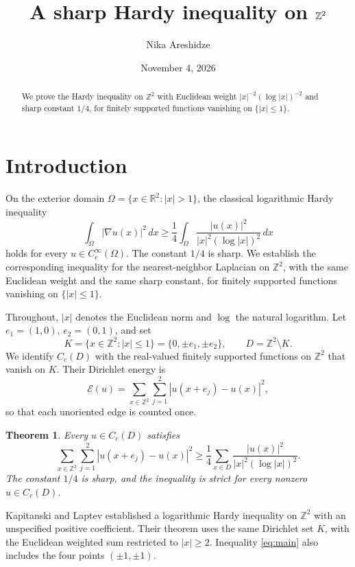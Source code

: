 \documentclass[11pt]{amsart}
\title[A sharp Hardy inequality on $\Z^2$]{A sharp Hardy inequality on $\Z^2$}
\author[N. Areshidze]{Nika Areshidze}
\date{November 4, 2026}
\newtheorem{theorem}{Theorem}[section]
\numberwithin{equation}{section}
\newcommand{\Z}{\mathbb Z}
\newcommand{\R}{\mathbb R}
\newcommand{\E}{\mathcal E}
\newcommand{\Cc}{C_c}
\begin{document}
\begin{abstract}
We prove the Hardy inequality on $\Z^2$ with Euclidean weight
$|x|^{-2}(\log|x|)^{-2}$ and sharp constant $1/4$, for finitely supported
functions vanishing on $\{|x|\le1\}$.
\end{abstract}
\maketitle
\vspace{-18pt}

\section{Introduction}

On the exterior domain $\Omega=\{x\in\R^2:|x|>1\}$, the classical
logarithmic Hardy inequality
\[
\int_{\Omega}|\nabla u(x)|^2\,dx
\ge\frac14\int_{\Omega}
\frac{|u(x)|^2}{|x|^2(\log|x|)^2}\,dx
\]
holds for every $u\in C_c^\infty(\Omega)$. The constant $1/4$ is sharp.
We establish the corresponding inequality for the nearest-neighbor
Laplacian on $\Z^2$, with the same Euclidean weight and the same sharp
constant, for finitely supported functions vanishing on $\{|x|\le1\}$.

Throughout, $|x|$ denotes the Euclidean norm and $\log$ the natural
logarithm. Let $e_1=(1,0)$, $e_2=(0,1)$, and set
\[
K=\{x\in\Z^2:|x|\le1\}=\{0,\pm e_1,\pm e_2\},
\qquad D=\Z^2\setminus K.
\]
We identify $\Cc(D)$ with the real-valued finitely supported functions
on $\Z^2$ that vanish on $K$. Their Dirichlet energy is
\begin{equation}\label{eq:energy}
\E(u)=\sum_{x\in\Z^2}\sum_{j=1}^2|u(x+e_j)-u(x)|^2,
\end{equation}
so that each unoriented edge is counted once.

\begin{theorem}\label{thm:main}
Every $u\in\Cc(D)$ satisfies
\begin{equation}\label{eq:main}
\sum_{x\in\Z^2}\sum_{j=1}^2|u(x+e_j)-u(x)|^2
\ge\frac14\sum_{x\in D}\frac{|u(x)|^2}{|x|^2(\log|x|)^2}.
\end{equation}
The constant $1/4$ is sharp, and the inequality is strict for every
nonzero $u\in\Cc(D)$.
\end{theorem}

Kapitanski and Laptev \cite[Theorem 4.1]{KL} established a logarithmic
Hardy inequality on $\Z^2$ with an unspecified positive coefficient.
Their theorem uses the same Dirichlet set $K$, with the Euclidean weighted
sum restricted to $|x|\ge2$. Inequality \eqref{eq:main} also includes
the four points $(\pm1,\pm1)$.
\end{document}
